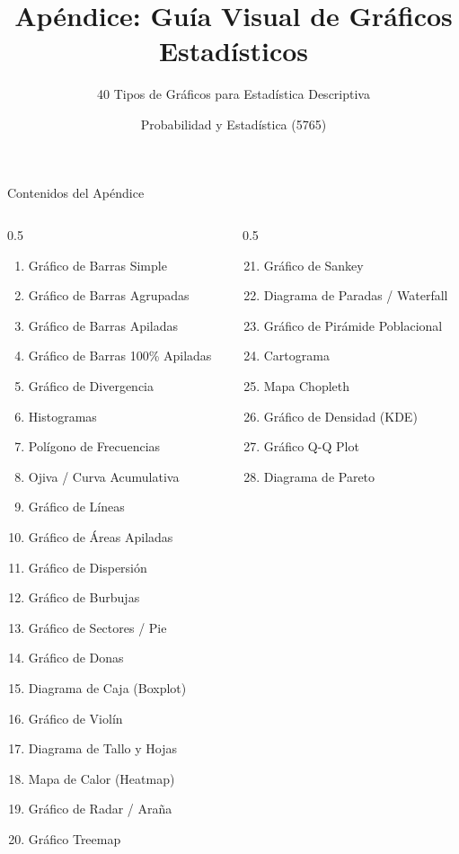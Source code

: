 \documentclass[aspectratio=169,10pt]{beamer}
\title[Prob. y Estadística]{Apéndice: Guía Visual de Gráficos Estadísticos}
\subtitle{40 Tipos de Gráficos para Estadística Descriptiva}
\institute[UNS]{Universidad Nacional del Sur \\ Departamento de Matemática}
\author{Probabilidad y Estadística (5765)}
\date{}
\begin{document}
\begin{frame}
\titlepage
\end{frame}

\begin{frame}{Contenidos del Apéndice}
\small
\begin{columns}[t]
\begin{column}{0.5\textwidth}
\begin{enumerate}
\item Gráfico de Barras Simple
\item Gráfico de Barras Agrupadas
\item Gráfico de Barras Apiladas
\item Gráfico de Barras 100\% Apiladas
\item Gráfico de Divergencia
\item Histogramas
\item Polígono de Frecuencias
\item Ojiva / Curva Acumulativa
\item Gráfico de Líneas
\item Gráfico de Áreas Apiladas
\item Gráfico de Dispersión
\item Gráfico de Burbujas
\item Gráfico de Sectores / Pie
\item Gráfico de Donas
\item Diagrama de Caja (Boxplot)
\item Gráfico de Violín
\item Diagrama de Tallo y Hojas
\item Mapa de Calor (Heatmap)
\item Gráfico de Radar / Araña
\item Gráfico Treemap
\end{enumerate}
\end{column}
\begin{column}{0.5\textwidth}
\begin{enumerate}
\setcounter{enumi}{20}
\item Gráfico de Sankey
\item Diagrama de Paradas / Waterfall
\item Gráfico de Pirámide Poblacional
\item Cartograma
\item Mapa Chopleth
\item Gráfico de Densidad (KDE)
\item Gráfico Q-Q Plot
\item Diagrama de Pareto

\end{enumerate}
\end{column}
\end{columns}
\end{frame}
\end{document}
